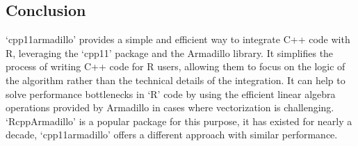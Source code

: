 \documentclass[preprint,12pt]{elsarticle}
\begin{document}
\subsection{Conclusion}\label{conclusion}

`cpp11armadillo' provides a simple and efficient way to integrate C++
code with R, leveraging the `cpp11' package and the Armadillo library.
It simplifies the process of writing C++ code for R users, allowing them
to focus on the logic of the algorithm rather than the technical details
of the integration. It can help to solve performance bottlenecks in `R'
code by using the efficient linear algebra operations provided by
Armadillo in cases where vectorization is challenging. `RcppArmadillo'
is a popular package for this purpose, it has existed for nearly a
decade, `cpp11armadillo' offers a different approach with similar
performance.
\end{document}
